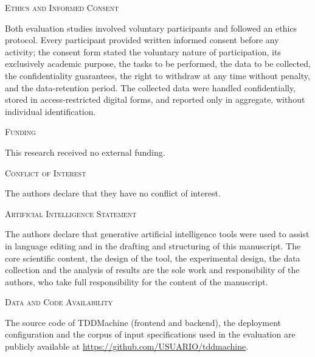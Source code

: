 \documentclass[10pt,journal,twoside,letterpaper]{IEEEtran}
\newcommand{\repourl}{https://github.com/USUARIO/tddmachine}  %
\newcommand{\seccionfunding}[1]{%
    \vspace{0.6em}
    \noindent\textsc{Funding}
    \par\vspace{0.2em}
    \small #1
    \par
}
\newcommand{\seccionconflicto}[1]{%
    \vspace{0.6em}
    \noindent\textsc{Conflict of Interest}
    \par\vspace{0.2em}
    \small #1
    \par
}
\newcommand{\seccioniadeclaracion}[1]{%
    \vspace{0.6em}
    \noindent\textsc{Artificial Intelligence Statement}
    \par\vspace{0.2em}
    \small #1
    \par
}
\newcommand{\seccionetica}[1]{%
    \vspace{0.6em}
    \noindent\textsc{Ethics and Informed Consent}
    \par\vspace{0.2em}
    \small #1
    \par
}
\newcommand{\secciondatos}[1]{%
    \vspace{0.6em}
    \noindent\textsc{Data and Code Availability}
    \par\vspace{0.2em}
    \small #1
    \par
}
\begin{document}
    \seccionetica{%
        Both evaluation studies involved voluntary participants and followed an ethics protocol. Every participant provided written informed consent before any activity; the consent form stated the voluntary nature of participation, its exclusively academic purpose, the tasks to be performed, the data to be collected, the confidentiality guarantees, the right to withdraw at any time without penalty, and the data-retention period. The collected data were handled confidentially, stored in access-restricted digital forms, and reported only in aggregate, without individual identification.
    }
    
    \seccionfunding{%
        This research received no external funding.
    }
    
    \seccionconflicto{%
        The authors declare that they have no conflict of interest.
    }
    
    \seccioniadeclaracion{%
        The authors declare that generative artificial intelligence tools were used to assist in language editing and in the drafting and structuring of this manuscript. The core scientific content, the design of the tool, the experimental design, the data collection and the analysis of results are the sole work and responsibility of the authors, who take full responsibility for the content of the manuscript.
    }
    
    \secciondatos{%
        The source code of TDDMachine (frontend and backend), the deployment configuration and the corpus of input specifications used in the evaluation are publicly available at \url{\repourl}.
    }
    
    
    
    
\end{document}
